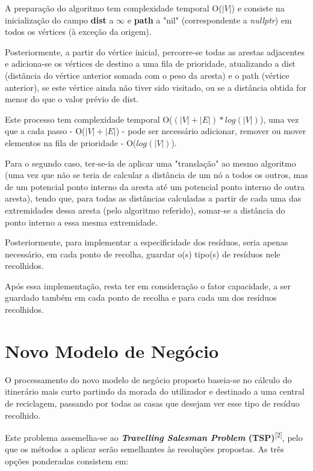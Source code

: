 \documentclass[article, a4paper, 12pt, oneside]{memoir}
\begin{document}
A preparação do algoritmo tem complexidade temporal O($|V|$) e consiste na inicialização do campo \textbf{dist} a $\infty$ e \textbf{path} a "nil" (correspondente a \textit{nullptr}) em todos os vértices (à exceção da origem).

Posteriormente, a partir do vértice inicial, percorre-se todas as arestas adjacentes e adiciona-se os vértices de destino a uma fila de prioridade, atualizando a dist (distância do vértice anterior somada com o peso da aresta) e o path (vértice anterior), se este vértice ainda não tiver sido visitado, ou se a distância obtida for menor do que o valor prévio de dist.

Este processo tem complexidade temporal O($(|V| + |E|)*log(|V|)$), uma vez que a cada passo - O($|V| + |E|$) - pode ser necessário adicionar, remover ou mover elementos na fila de prioridade - O($log(|V|)$).
	
Para o segundo caso, ter-se-ia de aplicar uma "translação" ao mesmo algoritmo (uma vez que não se teria de calcular a distância de um nó a todos os outros, mas de um potencial ponto interno da aresta até um potencial ponto interno de outra aresta), tendo que, para todas as distâncias calculadas a partir de cada uma das extremidades dessa aresta (pelo algoritmo referido), somar-se a distância do ponto interno a essa mesma extremidade.

Posteriormente, para implementar a especificidade dos resíduos, seria apenas necessário, em cada ponto de recolha, guardar o(s) tipo(s) de resíduos nele recolhidos.

Após essa implementação, resta ter em consideração o fator capacidade, a ser guardado também em cada ponto de recolha e para cada um dos resíduos recolhidos.

\section{Novo Modelo de Negócio}

O processamento do novo modelo de negócio proposto baseia-se no cálculo do itinerário mais curto partindo da morada do utilizador e destinado a uma central de reciclagem, passando por todas as casas que desejam ver esse tipo de resíduo recolhido.

Este problema assemelha-se ao \textbf{\textit{Travelling Salesman Problem} (TSP)}\textsuperscript{[2]}, pelo que os métodos a aplicar serão semelhantes às resoluções propostas. As três opções ponderadas consistem em:
\end{document}
